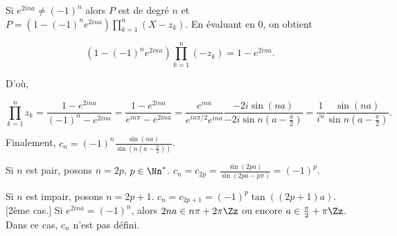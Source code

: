 {{\begin{itemize}
[1er cas.] Si $e^{2ina}\neq(-1)^n$ alors $P$ est de degré $n$ et $P=(1-(-1)^ne^{2ina})\prod_{k=1}^{n}(X-z_k)$. En évaluant en $0$, on obtient

$$(1-(-1)^ne^{2ina})\prod_{k=1}^{n}(-z_k)=1-e^{2ina}.$$

D'où,

$$\prod_{k=1}^{n}z_k=\frac{1-e^{2ina}}{(-1)^n-e^{2ina}}=\frac{1-e^{2ina}}{e^{in\pi}-e^{2ina}}=\frac{e^{ina}}{e^{in\pi/2}e^{ina}}\frac{-2i\sin(na)}{-2i\sin n(a-\frac{\pi}{2})}=\frac{1}{i^n} \frac{\sin(na)}{\sin n(a-\frac{\pi}{2})}.$$

Finalement, $c_n=(-1)^n\frac{\sin(na)}{\sin(n(a-\frac{\pi}{2}))}$.

Si $n$ est pair, posons $n=2p$, $p\in\Nn^*$. $c_n=c_{2p}=\frac{\sin(2pa)}{\sin (2pa-p\pi)}=(-1)^p$.

Si $n$ est impair, posons $n=2p+1$. $c_n=c_{2p+1}=(-1)^p\tan((2p+1)a)$.
[2ème cas.] Si $e^{2ina}=(-1)^n$, alors $2na\in n\pi+2\pi\Zz$ ou encore $a\in\frac{\pi}{2}+\pi\Zz$. Dans ce cas, $c_n$ n'est pas défini.
\end{itemize}
}
}
